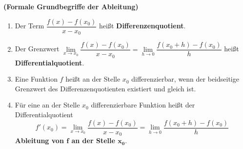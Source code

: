 \documentclass[ngerman, 12pt]{nssheetxea}
\begin{document}
\begin{definition} \textbf{(Formale Grundbegriffe der Ableitung)}
\begin{enumerate}
\item Der Term $\dfrac{f(x)-f(x_0)}{x-x_0}$ heißt \textbf{Differenzenquotient}.
\item Der Grenzwert $\lim\limits_{x\to x_0} \dfrac{f(x)-f(x_0)}{x-x_0} = \lim\limits_{h \to 0} \dfrac{f(x_0+h)-f(x_0)}{h}$ heißt \textbf{Differentialquotient}.
\item Eine Funktion $f$ heißt an der Stelle $x_0$ differenzierbar, wenn der beidseitige Grenzwert des Differenzenquotienten existiert und gleich ist.
\item Für eine an der Stelle $x_0$ differenzierbare Funktion heißt der Differentialquotient \[ f'(x_0)=\lim_{x\to x_0} \dfrac{f(x)-f(x_0)}{x-x_0} = \lim_{h \to 0} \dfrac{f(x_0+h)-f(x_0)}{h} \] \textbf{Ableitung von $\mathbf{f}$ an der Stelle $\mathbf{x_0}$}.
\end{enumerate}
  
\end{definition}
\end{document}

